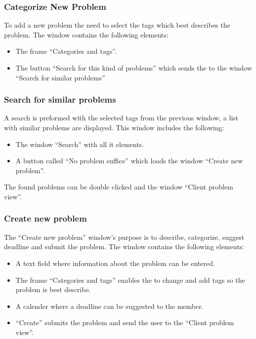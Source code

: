 \subsubsection{Categorize New Problem}
To add a new problem the \aclient[] need to select the tags which best describes the problem. The window contains the following elements:
\begin{itemize}
	\item The frame ``Categories and tags''.
	\item The button ``Search for this kind of problems'' which sends the \aclient[] to the window ``Search for similar problems''
\end{itemize}

\subsubsection{Search for similar problems}
A search is preformed with the selected tags from the previous window, a list with similar problems are displayed. This window includes the following: 
\begin{itemize}
	\item The window ``Search'' with all it elements.
	\item A button called ``No problem suffice'' which loads the window ``Create new problem''.
\end{itemize}
The found problems can be double clicked and the window ``Client problem view''. 

\subsubsection{Create new problem}
The ``Create new problem'' window's purpose is to describe, categorize, suggest deadline and submit the problem. The window contains the following elements:
\begin{itemize}
	\item A text field where information about the problem can be entered.
	\item The frame ``Categories and tags'' enables the \aclient to change and add tags so the problem is best describe.
	\item A calender where a deadline can be suggested to the \astaff member.
	\item ``Create'' submits the problem and send the user to the ``Client problem view''.
\end{itemize}







